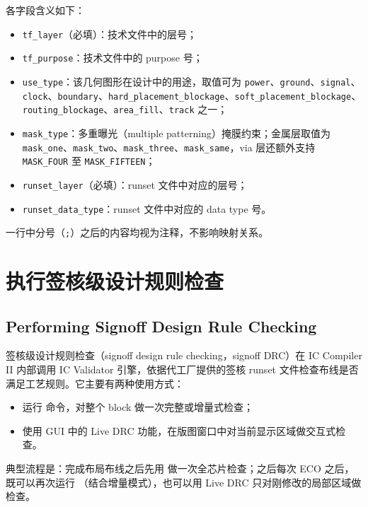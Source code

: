 各字段含义如下：
\begin{itemize}
  \item \texttt{tf\_layer}（必填）：技术文件中的层号；
  \item \texttt{tf\_purpose}：技术文件中的 purpose 号；
  \item \texttt{use\_type}：该几何图形在设计中的用途，取值可为 \texttt{power}、\texttt{ground}、\texttt{signal}、\texttt{clock}、\texttt{boundary}、\texttt{hard\_placement\_blockage}、\texttt{soft\_placement\_blockage}、\texttt{routing\_blockage}、\texttt{area\_fill}、\texttt{track} 之一；
  \item \texttt{mask\_type}：多重曝光（multiple patterning）掩膜约束；金属层取值为 \texttt{mask\_one}、\texttt{mask\_two}、\texttt{mask\_three}、\texttt{mask\_same}，via 层还额外支持 \texttt{MASK\_FOUR} 至 \texttt{MASK\_FIFTEEN}；
  \item \texttt{runset\_layer}（必填）：runset 文件中对应的层号；
  \item \texttt{runset\_data\_type}：runset 文件中对应的 data type 号。
\end{itemize}

一行中分号（\texttt{;}）之后的内容均视为注释，不影响映射关系。

\section{执行签核级设计规则检查}
\subsection*{Performing Signoff Design Rule Checking}

签核级设计规则检查（signoff design rule checking，signoff DRC）在 IC Compiler II 内部调用 IC Validator 引擎，依据代工厂提供的签核 runset 文件检查布线是否满足工艺规则。它主要有两种使用方式：
\begin{itemize}
  \item 运行  命令，对整个 block 做一次完整或增量式检查；
  \item 使用 GUI 中的 Live DRC 功能，在版图窗口中对当前显示区域做交互式检查。
\end{itemize}

典型流程是：完成布局布线之后先用  做一次全芯片检查；之后每次 ECO 之后，既可以再次运行 （结合增量模式），也可以用 Live DRC 只对刚修改的局部区域做检查。

